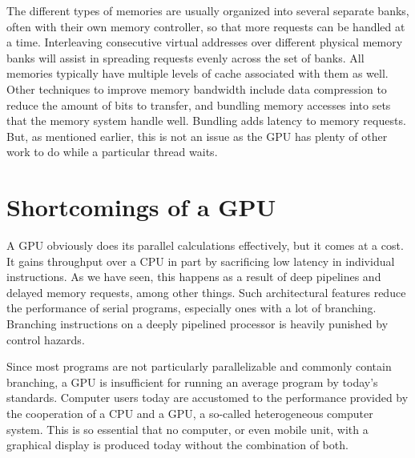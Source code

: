 \documentclass[../main/report.tex]{subfiles}
\begin{document}
The different types of memories are usually organized into several separate banks, often with their own memory controller, so that more requests can be handled at a time.
Interleaving consecutive virtual addresses over different physical memory banks will assist in spreading requests evenly across the set of banks. 
All memories typically have multiple levels of cache associated with them as well.
Other techniques to improve memory bandwidth include data compression to reduce the amount of bits to transfer, and bundling memory accesses into sets that the memory system handle well.
Bundling adds latency to memory requests.
But, as mentioned earlier, this is not an issue as the GPU has plenty of other work to do while a particular thread waits.

\section{Shortcomings of a GPU}


A GPU obviously does its parallel calculations effectively, but it comes at a cost.
It gains throughput over a CPU in part by sacrificing low latency in individual instructions.
As we have seen, this happens as a result of deep pipelines and delayed memory requests, among other things.
Such architectural features reduce the performance of serial programs, especially ones with a lot of branching.
Branching instructions on a deeply pipelined processor is heavily punished by control hazards.

Since most programs are not particularly parallelizable and commonly contain branching, a GPU is insufficient for running an average program by today's standards.
Computer users today are accustomed to the performance provided by the cooperation of a CPU and a GPU, a so-called heterogeneous computer system.
This is so essential that no computer, or even mobile unit, with a graphical display is produced today without the combination of both.
\end{document}
